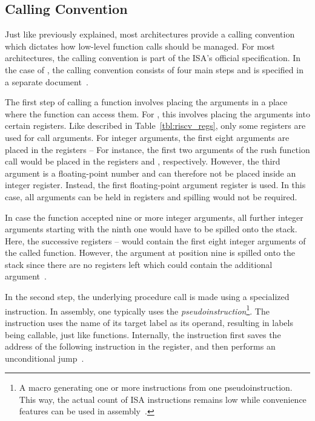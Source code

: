 \subsection{Calling Convention}\label{sec:riscv_calling_conv}

Just like previously explained, most architectures provide a calling convention which dictates how low-level function calls should be managed.
For most architectures, the calling convention is part of the ISA's official specification.
In the case of \riscv{}, the calling convention consists of four main steps and is specified in a separate document~\cite{RiscvABI2022}.

The first step of calling a function involves placing the arguments in a place where the function can access them.
For \riscv{}, this involves placing the arguments into certain registers.
Like described in Table~\ref{tbl:riscv_regs}, only some registers are used for call arguments.
For integer arguments, the first eight arguments are placed in the registers --
For instance, the first two arguments of the rush function call
 would be placed in the registers  and , respectively.
However, the third argument is a floating-point number and can therefore not be placed inside an integer register.
Instead, the first floating-point argument register  is used.
In this case, all arguments can be held in registers and spilling would not be required.

In case the function accepted nine or more integer arguments,
all further integer arguments starting with the ninth one would have to be spilled onto the stack.
Here, the successive registers -- would contain the first eight integer arguments of the called function.
However, the argument at position nine is spilled onto the stack since there are no registers left which could contain the additional argument~\cite[p.~8]{RiscvABI2022}.

In the second step, the underlying procedure call is made using a specialized instruction.
In \riscv{} assembly, one typically uses the  \emph{pseudoinstruction}\footnote{A macro generating one or more instructions from one pseudoinstruction. This way, the actual count of ISA instructions remains low while convenience features can be used in assembly~\cite[p.~68]{Dandamudi2005}.}.
The instruction uses the name of its target label as its operand, resulting in labels being callable, just like functions.
Internally, the instruction first saves the address of the following instruction in the  register, and then performs an unconditional jump~\cite[p.~22]{Patterson2017}.

